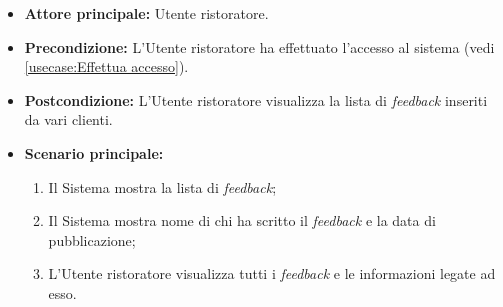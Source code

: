 \label{usecase:Visualizzazione lista feedback}
\begin{itemize}
	\item \textbf{Attore principale:} Utente ristoratore.

	\item \textbf{Precondizione:} L'Utente ristoratore ha effettuato l'accesso al sistema (vedi \autoref{usecase:Effettua accesso}).

	\item \textbf{Postcondizione:} L'Utente ristoratore visualizza la lista di \textit{feedback} inseriti da vari clienti.


	\item \textbf{Scenario principale:}
	      \begin{enumerate}
		      \item Il Sistema mostra la lista di \textit{feedback};
		      \item Il Sistema mostra nome di chi ha scritto il \textit{feedback} e la data di pubblicazione;
		      \item L'Utente ristoratore visualizza tutti i \textit{feedback} e le informazioni legate ad esso.

	      \end{enumerate}
\end{itemize}

